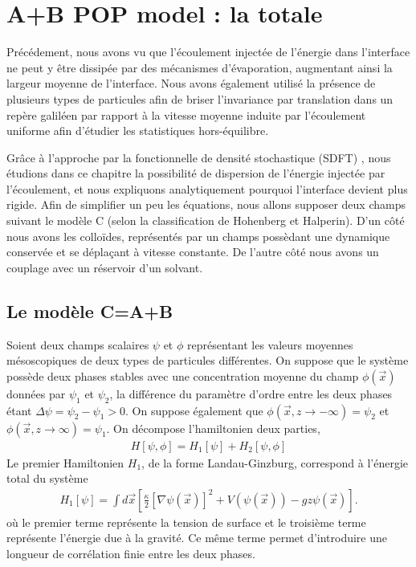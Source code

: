 \chapter{A+B POP model : la totale}
\label{chap-article-dean}

Précédement, nous avons vu que l'écoulement injectée de l'énergie dans l'interface ne peut y être dissipée par des mécanismes d'évaporation, augmentant ainsi la largeur moyenne de l'interface. Nous avons également utilisé la présence de plusieurs types de particules afin de briser l'invariance par translation dans un repère galiléen par rapport à la vitesse moyenne induite par l'écoulement uniforme afin d'étudier les statistiques hors-équilibre.

Grâce à l'approche par la fonctionnelle de densité stochastique (SDFT) \cite{dean1996}, nous étudions dans ce chapitre la possibilité de dispersion de l'énergie injectée par l'écoulement, et nous expliquons analytiquement pourquoi l'interface devient plus rigide.
Afin de simplifier un peu les équations, nous allons supposer deux champs suivant le modèle C (selon la classification de Hohenberg et Halperin\cite{hohenberg_theory_1977}). D'un côté nous avons les colloïdes, représentés par un champs possèdant une dynamique conservée et se déplaçant à vitesse constante. De l'autre côté nous avons un couplage avec un réservoir d'un solvant. 

    \section{Le modèle C=A+B}
    
Soient deux champs scalaires $\psi$ et $\phi$ représentant les valeurs moyennes mésoscopiques de deux types de particules différentes. On suppose que le système possède deux phases stables avec une concentration moyenne du champ $\phi(\vec{x})$ données par $\psi_1$ et  $\psi_2$, la différence du paramètre d'ordre entre les deux phases étant $\Delta\psi= \psi_2 -\psi_1\greater 0$. On suppose également que $\phi(\vec{x},z\rightarrow -\infty)=\psi_2$ et $\phi(\vec{x},z\rightarrow \infty)=\psi_1$. On décompose l'hamiltonien deux parties, 
\begin{align}
    H[\psi,\phi] = H_1[\psi] +H_2[\psi,\phi]
\end{align}
Le premier Hamiltonien $H_1$, de la forme Landau-Ginzburg, correspond à l'énergie total du système
\begin{align}
    H_1[\psi]=\int d\vec{x}\left[\frac{\kappa}{2}[\nabla\psi(\vec{x})]^2 + V(\psi(\vec{x}))- gz \psi(\vec{x})\right].
\end{align}
où le premier terme représente la tension de surface et le troisième terme représente l'énergie due à la gravité. Ce même terme permet d'introduire une longueur de corrélation finie entre les deux phases. 

